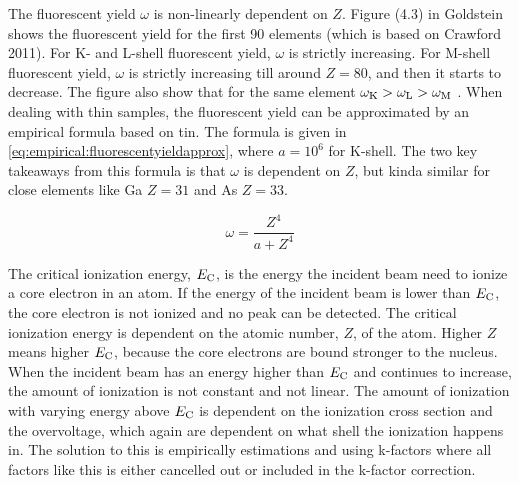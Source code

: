 












The fluorescent yield $\omega$ is non-linearly dependent on $Z$.
Figure (4.3)  in Goldstein \cite{goldstein_scanning_2018}  shows the fluorescent yield for the first 90 elements (which is based on Crawford 2011).
For K- and L-shell fluorescent yield, $\omega$ is strictly increasing.
For M-shell fluorescent yield, $\omega$ is strictly increasing till around $Z=80$, and then it starts to decrease.
The figure also show that for the same element $\omega_{\textnormal{K}}  > \omega_{\textnormal{L}} > \omega_{\textnormal{M}}$ .
When dealing with thin samples, the fluorescent yield can be approximated by an empirical formula based on tin.
The formula is given in \cref{eq:empirical:fluorescentyieldapprox}, where $a=10^6$ for K-shell. 
The two key takeaways from this formula is that $\omega$ is dependent on $Z$, but kinda similar for close elements like Ga $Z = 31$ and As $Z = 33$.



\begin{equation}
    \label{eq:empirical:fluorescentyieldapprox}
    \omega = \frac{Z^4}{a + Z^4}
\end{equation}

The critical ionization energy, $E_\textnormal{C}$, is the energy the incident beam need to ionize a core electron in an atom.
If the energy of the incident beam is lower than $E_\textnormal{C}$, the core electron is not ionized and no peak can be detected.
The critical ionization energy is dependent on the atomic number, $Z$, of the atom.
Higher $Z$ means higher $E_\textnormal{C}$, because the core electrons are bound stronger to the nucleus.
When the incident beam has an energy higher than $E_\textnormal{C}$ and continues to increase, the amount of ionization is not constant and not linear.
The amount of ionization with varying energy above $E_\textnormal{C}$ is dependent on the ionization cross section and the overvoltage, which again are dependent on what shell the ionization happens in.
The solution to this is empirically estimations and using k-factors where all factors like this is either cancelled out or included in the k-factor correction.

